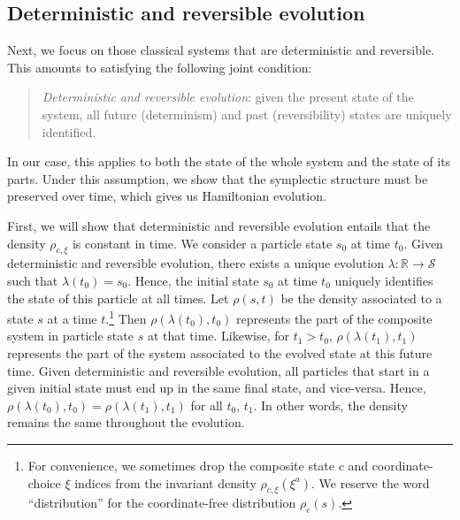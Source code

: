 \documentclass[12pt, twoside]{article}
\newcommand\bs{\begin{singlespace}}
\newcommand\es{\end{singlespace}}
\begin{document}


\subsection{Deterministic and reversible evolution}
\label{deterministic}

Next, we focus on those classical systems that are deterministic and reversible. This amounts to satisfying the following joint condition:

\begin{quotation}
\bs
\noindent
\textit{Deterministic and reversible evolution}: given the present state of the system, all future (determinism) and past (reversibility) states are uniquely identified. \es
\end{quotation}

\noindent In our case, this applies to both the state of the whole system and the state of its parts. Under this assumption, we show that the symplectic structure must be preserved over time, which gives us Hamiltonian evolution.

First, we will show that deterministic and reversible evolution entails that the density $\rho_{c, \xi}$ is constant in time. We consider a particle state $s_0$ at time $t_0$. Given deterministic and reversible evolution, there exists a unique evolution $\lambda: \mathbb{R} \to \mathcal{S}$ such that $\lambda(t_0) = s_0$. Hence, the initial state $s_0$ at time $t_0$ uniquely identifies the state of this particle at all times. Let $\rho(s, t)$ be the density associated to a state $s$ at a time $t$.\footnote{For convenience, we sometimes drop the composite state $c$ and coordinate-choice $\xi$ indices from the invariant density $\rho_{c, \xi} (\xi^a)$. We reserve the word ``distribution'' for the coordinate-free distribution $\rho_c (s)$. } Then  $\rho(\lambda(t_0), t_0)$ represents the part of the composite system in particle state $s$ at that time. Likewise, for $t_1 > t_0$,  $\rho(\lambda(t_1), t_1)$ represents the part of the system associated to the evolved state at this future time. Given deterministic and reversible evolution, all particles that start in a given initial state must end up in the same final state, and vice-versa. Hence, $\rho(\lambda(t_0), t_0) = \rho(\lambda(t_1), t_1)$ for all $t_0,\, t_1$. In other words, the density remains the same throughout the evolution.
\end{document}
